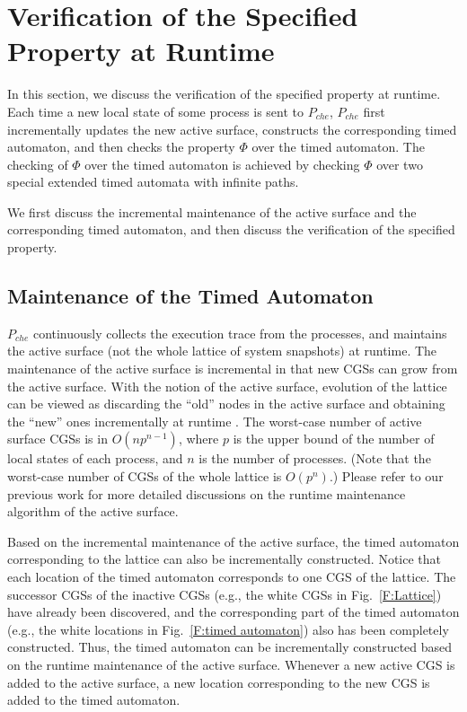 \documentclass[10pt,conference,compsocconf,letterpaper]{IEEEtran}
\begin{document}
\section{Verification of the Specified Property at Runtime} \label{sec:Detection}

In this section, we discuss the verification of the specified property at runtime. Each time a new local state of some process is sent to $P_{che}$, $P_{che}$ first incrementally updates the new active surface, constructs the corresponding timed automaton, and then checks the property $\Phi$ over the timed automaton. The checking of $\Phi$ over the timed automaton is achieved by checking $\Phi$ over two special extended timed automata with infinite paths.

We first discuss the incremental maintenance of the active surface and the corresponding timed automaton, and then discuss the verification of the specified property.

\subsection{Maintenance of the Timed Automaton}

$P_{che}$ continuously collects the execution trace from the processes, and maintains the active surface (not the whole lattice of system snapshots) at runtime. The maintenance of the active surface is incremental in that new CGSs can grow from the active surface. With the notion of the active surface, evolution of the lattice can be viewed as discarding the ``old'' nodes in the active surface and obtaining the ``new'' ones incrementally at runtime \cite{Yang13}. The worst-case number of active surface CGSs is in $O(np^{n-1})$, where $p$ is the upper bound of the number of local states of each process, and $n$ is the number of processes. (Note that the worst-case number of CGSs of the whole lattice is $O(p^n)$.) Please refer to our previous work \cite{Yang13} for more detailed discussions on the runtime maintenance algorithm of the active surface.

Based on the incremental maintenance of the active surface, the timed automaton corresponding to the lattice can also be incrementally constructed. Notice that each location of the timed automaton corresponds to one CGS of the lattice. The successor CGSs of the inactive CGSs (e.g., the white CGSs in Fig.~\ref{F:Lattice}) have already been discovered, and the corresponding part of the timed automaton (e.g., the white locations in Fig.~\ref{F:timed automaton}) also has been completely constructed. Thus, the timed automaton can be incrementally constructed based on the runtime maintenance of the active surface. Whenever a new active CGS is added to the active surface, a new location corresponding to the new CGS is added to the timed automaton.
\end{document}
